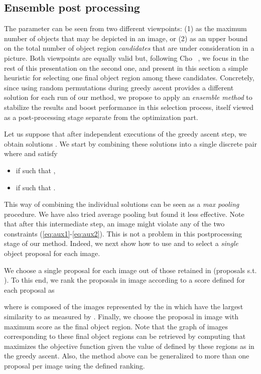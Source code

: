 \documentclass[10pt,twocolumn,letterpaper]{article}
\numberwithin{theorem}{section}
\begin{document}
\subsection{Ensemble post processing}
\label{subsec:ensemble_method}

The parameter  can be seen from two different 
viewpoints: (1) as the maximum number of objects that may be depicted in 
an image, or (2) as an upper bound on the total number of object region 
{\em candidates} that are under consideration in a picture. Both 
viewpoints are equally valid but, following Cho \etal~\cite{CKSP15}, we 
focus in the rest of this presentation on the second one, and present in 
this section a simple heuristic for selecting one final object region 
among these candidates. Concretely, since using random permutations 
during greedy ascent provides a different solution for each run of our 
method, we propose to apply an {\em ensemble method} to stabilize the 
results and boost performance in this selection process, itself viewed 
as a post-processing stage separate from the optimization part.

Let us suppose that after  independent executions of the greedy ascent
step, we obtain  solutions . We start by combining these solutions into a
single discrete pair  where  and
 satisfy
\begin{itemize}
    \vspace{-1mm}
	\item  if  such that ,
	\vspace{-1mm}
	\item  if  such that . 
	\vspace{-1mm}
\end{itemize}
This way of combining the individual solutions can be seen as a \textit{max pooling} procedure. We have also tried average pooling but found it less effective. Note that after this intermediate step, an image might violate any of the two constraints (\ref{eq:aux1}-\ref{eq:aux2}). This is not a problem in this postprocessing stage of our method. Indeed, we next show how to use  and  to select a {\em single} object proposal for each image.




We choose a single proposal for each image out of those retained in  (proposals  s.t. ). To this end, we rank the proposals in image  according to a score  defined for each proposal  as
\vspace{-1mm}

where 
 is composed of the  images represented by the  in  which have the largest similarity to  as measured by . Finally, we choose the proposal in image  with maximum score  as the final object region. Note that the graph of images corresponding to these final object regions can be retrieved by computing  that maximizes the objective function given the value of  defined by these regions as in the greedy ascent. Also, the method above can be generalized to more than one proposal per image using the defined ranking.
\end{document}
